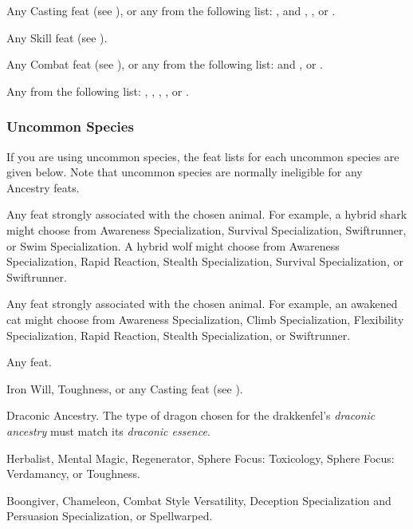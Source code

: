      Any Casting feat (see ), or any from the following list: ,  and , , or .

     Any Skill feat (see ).

     Any Combat feat (see ), or any from the following list:  and , or .

     Any from the following list: , , , , or .

    \subsubsection{Uncommon Species}
      If you are using uncommon species, the feat lists for each uncommon species are given below.
      Note that uncommon species are normally ineligible for any Ancestry feats.

       Any feat strongly associated with the chosen animal. For example, a hybrid shark might choose from Awareness Specialization, Survival Specialization, Swiftrunner, or Swim Specialization. A hybrid wolf might choose from Awareness Specialization, Rapid Reaction, Stealth Specialization, Survival Specialization, or Swiftrunner.

       Any feat strongly associated with the chosen animal. For example, an awakened cat might choose from Awareness Specialization, Climb Specialization, Flexibility Specialization, Rapid Reaction, Stealth Specialization, or Swiftrunner.

       Any feat.

       Iron Will, Toughness, or any Casting feat (see ).

       Draconic Ancestry. The type of dragon chosen for the drakkenfel's \textit{draconic ancestry} must match its \textit{draconic essence}.

       Herbalist, Mental Magic, Regenerator, Sphere Focus: Toxicology, Sphere Focus: Verdamancy, or Toughness.

       Boongiver, Chameleon, Combat Style Versatility, Deception Specialization and Persuasion Specialization, or Spellwarped.

